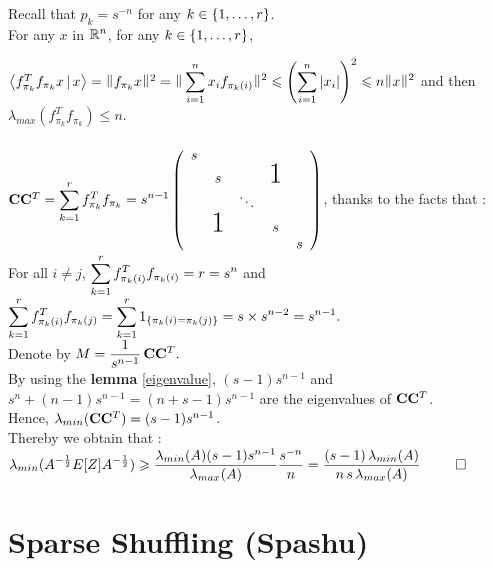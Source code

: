 Recall that $p_{k} = s^{-n}$ for any $k\in \left\{1,\dots,r\right\}$.\\

For any $x$ in ${\mathbb R}^{n}$, for any $k\in \left\{1,\dots,r\right\}$,

$\scal{f_{\pi_{k}}^{T} f_{\pi_{k}} x }{x} = \norm{ f_{\pi_{k}}x }^{2} = \norm{\dsp\sum_{i=1}^{n} x_{i}f_{\pi_{k}(i)} }^{2} \leq \pare{\dsp\sum_{i=1}^{n} \abs{x_{i}}}^{2} \leq n\norm{x}^{2}$
 and then $\lambda_{max}( f_{\pi_{k}}^{T} f_{\pi_{k}}  ) \leq n$.\\\\
 
 
 
$\bold{C} \bold{C}^{T}= \dsp\sum\limits_{k=1}^{r} f_{\pi_{k}}^{T} f_{\pi_{k}} = s^{n-1}
    \left(
    \begin{array}{ccccc}
    s                                    \\
      & s             &   & \text{\huge1}\\
      &               & \ddots               \\
      & \text{\huge1} &   & s            \\
      &               &   &   & s
    \end{array}
    \right)$, thanks to the facts that :\\ For all $i\neq j$, $\displaystyle\sum\limits_{k=1}^{r} f_{\pi_{k}(i)}^{T} f_{\pi_{k}(i)} = r = s^{n}$ and $\displaystyle\sum\limits_{k=1}^{r} f_{\pi_{k}(i)}^{T} f_{\pi_{k}(j)} = \displaystyle\sum\limits_{k=1}^{r} 1_{\left\{\pi_{k}(i) = \pi_{k}(j)\right\}} = s \times s^{n-2} = s^{n-1}.$\\
Denote by $\displaystyle M = \frac{1}{s^{n-1}}\, \bold{C} \bold{C}^{T}.$\\

By using the \textbf{lemma} \ref{eigenvalue}, $(s-1)s^{n-1}$ and $s^{n} + (n-1)s^{n-1} = (n+s-1)s^{n-1}$ are the eigenvalues of $\bold{C} \bold{C}^{T}$.\\
Hence, $\lambda_{min}(\bold{C} \bold{C}^{T}) = (s-1)s^{n-1}$.\\

Thereby we obtain that :\\ 


$\displaystyle \lambda_{min}(A^{-\frac12}E[Z]A^{-\frac12} )  \geqslant  \frac{\lambda_{min}(A) (s-1)s^{n-1}}{ \lambda_{max}(A)}  \frac{s^{-n}}{n} =  \frac{(s-1)\,\lambda_{min}(A)}{n \, s \,\lambda_{max}(A)} $ $\qed$


\section{Sparse Shuffling (Spashu)}

